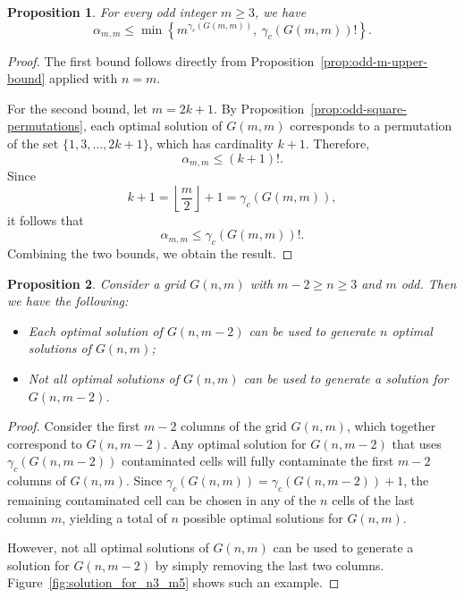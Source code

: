 \documentclass[letterpaper,12pt]{article}
\newtheorem{proposition}{Proposition}
\begin{document}
\begin{proposition}\label{prop:square-upper-bounds}
For every odd integer $m\ge 3$, we have
\[
\alpha_{m,m}\le \min\!\left\{ m^{\gamma_c(G(m,m))},\ \gamma_c(G(m,m))!\right\}.
\]
\end{proposition}

\begin{proof}
The first bound  follows directly from Proposition~\ref{prop:odd-m-upper-bound} applied with $n=m$.

For the second bound, let $m=2k+1$. By Proposition~\ref{prop:odd-square-permutations}, each
optimal solution of $G(m,m)$ corresponds to a permutation of the set $\{1,3,\dots,2k+1\}$, which has cardinality $k+1$. Therefore,
\[
\alpha_{m,m}\le (k+1)!.
\]
Since
\[
k+1=\left\lfloor\frac{m}{2}\right\rfloor+1=\gamma_c(G(m,m)),
\]
it follows that
\[
\alpha_{m,m}\le \gamma_c(G(m,m))!.
\]
Combining the two bounds, we obtain the result.\qedhere
\end{proof}
 
 
 


\begin{proposition}
    Consider a grid $G(n,m)$ with $m-2 \geq n \geq 3$ and $m$ odd. Then we have the following: 
    \begin{itemize}
        \item Each optimal solution of $G(n,m-2)$ can be used to generate $n$ 
        optimal solutions of $G(n,m)$;
        \item Not all optimal solutions of $G(n,m)$ can be used to generate a solution for $G(n,m-2)$.
    \end{itemize}
\end{proposition}

\begin{proof}
    Consider the first $m-2$ columns of the grid $G(n,m)$, which together correspond to $G(n,m-2)$.  Any optimal solution for $G(n,m-2)$ that uses $\gamma_c(G(n,m-2))$ 
    contaminated cells will fully contaminate the first $m-2$ columns of $G(n,m)$.  
    Since  $\gamma_c(G(n,m)) = \gamma_c(G(n,m-2)) + 1$, the remaining contaminated cell can be chosen in any of the $n$ cells of the last column $m$, yielding a total of $n$ possible optimal solutions for $G(n,m)$.

    However, not all optimal solutions of $G(n,m)$ can be used to generate a solution for $G(n,m-2)$ by simply removing the last two columns.  
    Figure~\ref{fig:solution_for_n3_m5} shows such an example.\qedhere
\end{proof}
\end{document}
